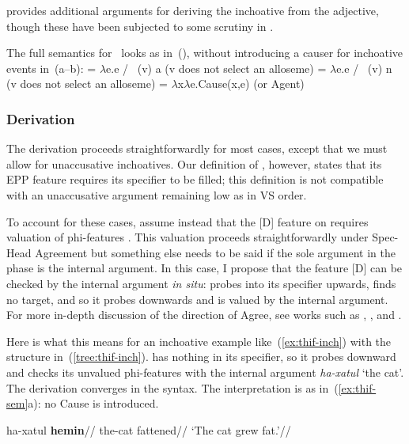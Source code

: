 \cite{borer91} provides additional arguments for deriving the inchoative from the adjective, though these have been subjected to some scrutiny in \citet[83]{kastner16phd}.

The full semantics for \vd~looks as in~(\nextx), without introducing a causer for inchoative events in~(\nextx a--b):
\pex\label{ex:thif-sem}
	\a \denote{\vd} = $\lambda$e.e / \trace~(v) a \phantom{xxxxx} (v does not select an alloseme)
	\a \denote{\vd} = $\lambda$e.e / \trace~(v) n \phantom{xxxxx} (v does not select an alloseme)
	\a \denote{\vd} = $\lambda$x$\lambda$e.Cause(x,e) \hfill (or Agent)
\xe


		\subsubsection{Derivation}
The derivation proceeds straightforwardly for most cases, except that we must allow for unaccusative inchoatives. Our definition of {\vd}, however, states that its EPP feature requires its specifier to be filled; this definition is not compatible with an unaccusative argument remaining low as in VS order.

To account for these cases, assume instead that the [D] feature on {\vd} requires valuation of phi-features \citep{nie17,schaefer17oup}. This valuation proceeds straightforwardly under Spec-Head Agreement but something else needs to be said if the sole argument in the phase is the internal argument. In this case, I propose that the feature [D] can be checked by the internal argument \emph{in situ}: {\vd} probes into its specifier upwards, finds no target, and so it probes downwards and is valued by the internal argument. For more in-depth discussion of the direction of Agree, see works such as \cite{bejarrezac09}, \cite{zeijlstra12}, \cite{preminger13tlr} and \cite{deal15nels}.

Here is what this means for an inchoative example like~(\ref{ex:thif-inch}) with the structure in~(\ref{tree:thif-inch}). {\vd} has nothing in its specifier, so it probes downward and checks its unvalued phi-features with the internal argument \emph{ha-xatul} `the cat'. The derivation converges in the syntax. The interpretation is as in~(\ref{ex:thif-sem}a): no Cause is introduced.

\ex\label{ex:thif-inch} \begingl
	\gla ha-xatul \textbf{hemin}//
	\glb the-cat fattened//
	\glft `The cat grew fat.'//
	\endgl
\xe
	
